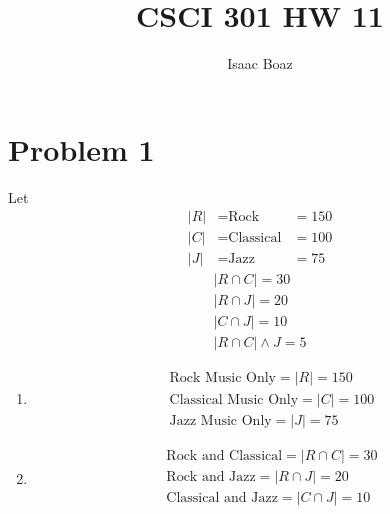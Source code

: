 \documentclass{article}
\title{\vspace{-5ex}CSCI 301 HW 11}
\author{Isaac Boaz}
\begin{document}
\maketitle

\section*{Problem 1}
Let
\begin{align*}
    |R| & = \text{Rock}      & = 150 \\
    |C| & = \text{Classical} & = 100 \\
    |J| & = \text{Jazz}      & = 75
\end{align*}
\begin{align*}
    |R \cap C| = 30 \\
    |R \cap J| = 20 \\
    |C \cap J| = 10 \\
    |R \cap C| \wedge J = 5
\end{align*}

\begin{enumerate}[label=\alph*]
    \item \begin{align*}
              \text{Rock Music Only} = |R| = 150      \\
              \text{Classical Music Only} = |C| = 100 \\
              \text{Jazz Music Only} = |J| = 75
          \end{align*}
    \item \begin{align*}
              \text{Rock and Classical} = |R \cap C| = 30 \\
              \text{Rock and Jazz} = |R \cap J| = 20      \\
              \text{Classical and Jazz} = |C \cap J| = 10 \\
          \end{align*}
\end{enumerate}

\pagebreak
\end{document}

